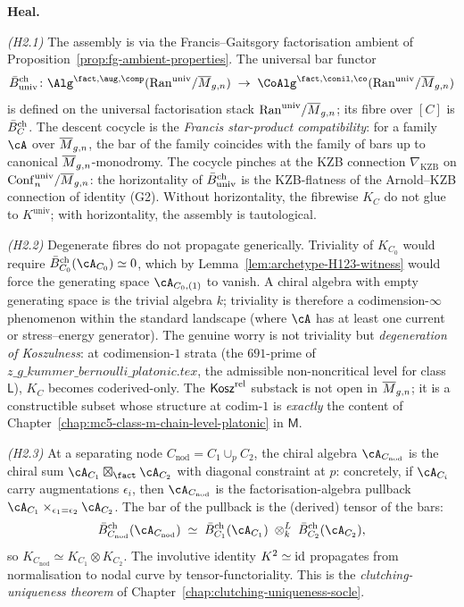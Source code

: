 \medskip
\textbf{Heal.}

\emph{(H2.1)} The assembly is via the Francis--Gaitsgory
factorisation ambient of
Proposition~\ref{prop:fg-ambient-properties}. The universal bar
functor
\[
\Bbarch_{\mathrm{univ}}\colon
\Alg^{\fact,\aug,\comp}(\Ran^{\mathrm{univ}}/\Moduli_{g,n})
\;\to\;
\CoAlg^{\fact,\conil,\co}(\Ran^{\mathrm{univ}}/\Moduli_{g,n})
\]
is defined on the universal factorisation stack
$\mathrm{Ran}^{\mathrm{univ}}/\overline{M}_{g,n}$; its fibre over $[C]$ is
$\bar{B}^{\mathrm{ch}}_{C}$. The descent cocycle is the \emph{Francis star-product
compatibility}: for a family $\cA$ over $\overline{M}_{g,n}$, the bar of
the family coincides with the family of bars up to canonical
$\overline{M}_{g,n}$-monodromy. The cocycle pinches at the KZB connection
$\nabla_{\mathrm{KZB}}$ on $\mathrm{Conf}_{n}^{\mathrm{univ}}/\overline{M}_{g,n}$:
the horizontality of $\bar{B}^{\mathrm{ch}}_{\mathrm{univ}}$ is the KZB-flatness of
the Arnold--KZB connection of identity (G2). Without horizontality,
the fibrewise $K_{C}$ do not glue to $K^{\mathrm{univ}}$; with
horizontality, the assembly is tautological.

\emph{(H2.2)} Degenerate fibres do not propagate generically. Triviality
of $K_{C_{0}}$ would require
$\Bbarch_{C_{0}}(\cA_{C_{0}}) \simeq 0$, which by
Lemma~\ref{lem:archetype-H123-witness} would force the generating
space $\cA_{C_{0},(1)}$ to vanish. A chiral algebra with empty
generating space is the trivial algebra $k$; triviality is therefore
a codimension-$\infty$ phenomenon within the standard landscape
(where $\cA$ has at least one current or stress--energy generator).
The genuine worry is not triviality but \emph{degeneration of
Koszulness}: at codimension-$1$ strata (the $691$-prime of
$z\_g\_kummer\_bernoulli\_platonic.tex$, the admissible
non-noncritical level for class~$\mathsf{L}$), $K_{C}$ becomes
coderived-only. The $\mathsf{Kosz}^{\mathrm{rel}}$ substack is not open in
$\overline{M}_{g,n}$; it is a constructible subset whose structure at
codim-$1$ is \emph{exactly} the content of
Chapter~\ref{chap:mc5-class-m-chain-level-platonic} in $\mathsf{M}$.

\emph{(H2.3)} At a separating node
$C_{\mathrm{nod}} = C_{1}\cup_{p}C_{2}$, the chiral algebra
$\cA_{C_{\mathrm{nod}}}$ is the chiral sum
$\cA_{C_{1}}\boxtimes_{\fact}\cA_{C_{2}}$
with diagonal constraint at $p$: concretely, if $\cA_{C_{i}}$ carry
augmentations $\epsilon_{i}$, then
$\cA_{C_{\mathrm{nod}}}$ is the factorisation-algebra pullback
$\cA_{C_{1}}\times_{\epsilon_{1}=\epsilon_{2}}\cA_{C_{2}}$. The bar of
the pullback is the (derived) tensor of the bars:
\[
\Bbarch_{C_{\mathrm{nod}}}(\cA_{C_{\mathrm{nod}}})
\;\simeq\;
\Bbarch_{C_{1}}(\cA_{C_{1}})\;\otimes^{L}_{k}\;\Bbarch_{C_{2}}(\cA_{C_{2}}),
\]
so $K_{C_{\mathrm{nod}}} \simeq K_{C_{1}}\otimes K_{C_{2}}$. The
involutive identity $K^{2}\simeq\mathrm{id}$ propagates from normalisation to
nodal curve by tensor-functoriality. This is the
\emph{clutching-uniqueness theorem} of
Chapter~\ref{chap:clutching-uniqueness-socle}.

